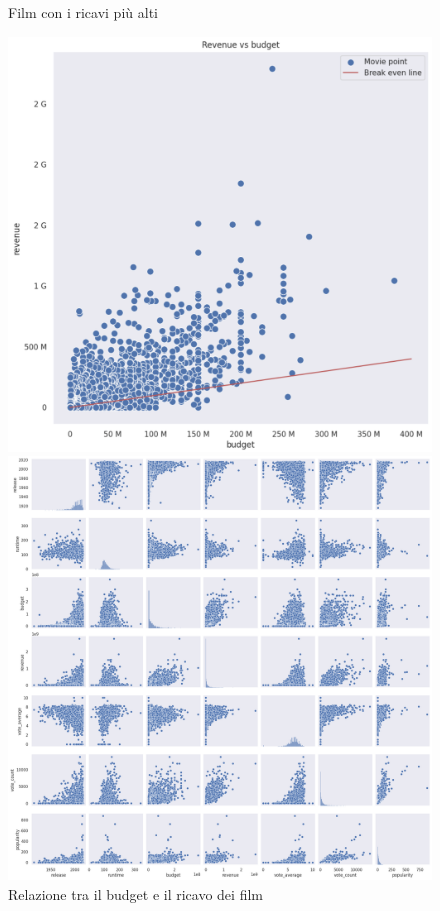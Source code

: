 \documentclass{report}
\begin{document}
\begin{figure}[H]
\begin{minipage}{.45\textwidth}
                \caption{Film con i ricavi più alti}
                \label{fig:enter-label}
            \end{minipage}
            \begin{minipage}{.45\textwidth}
                \centering
                \includegraphics[width=1\linewidth]{EDA/eda5.png}
                \caption{Relazione tra il budget e il ricavo dei film}
                \label{fig:enter-label}
            \end{minipage}
            \begin{minipage}{.45\textwidth}
            \centering
            \includegraphics[width=1\linewidth]{EDA/eda7.png}

\end{minipage}
\end{figure}
\end{document}
